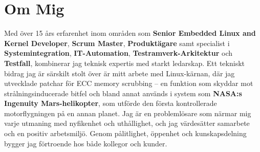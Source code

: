 \documentclass[10pt,a4paper,sans]{moderncv}
\begin{document}
\makecvtitle

\section{Om Mig}
Med över 15 års erfarenhet inom omr{\aa}den som \textbf{Senior Embedded Linux
and Kernel Developer}, \textbf{Scrum Master}, \textbf{Produktägare} samt
specialist i \textbf{Systemintegration}, \textbf{IT-Automation},
\textbf{Testramverk-Arkitektur} och \textbf{Testfall}, kombinerar jag teknisk
expertis med starkt ledarskap.
\newline
\newline
Ett tekniskt bidrag jag är särskilt stolt över är mitt arbete med Linux-kärnan,
där jag utvecklade patchar för ECC memory scrubbing – en funktion som skyddar
mot strålningsinducerade bitfel och bland annat används i system som
\textbf{NASA:s Ingenuity Mars-helikopter}, som utförde den första kontrollerade
motorflygningen på en annan planet.
\newline
\newline
Jag är en problemlösare som närmar mig varje utmaning med nyfikenhet och
uth{\aa}llighet, och jag värdesätter samarbete och en positiv arbetsmiljö. Genom
pålitlighet, öppenhet och kunskapsdelning bygger jag förtroende hos både
kollegor och kunder.

\end{document}
